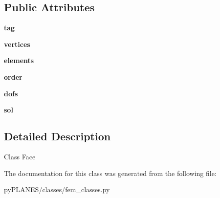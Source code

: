 \subsection*{Public Attributes}
\begin{DoxyCompactItemize}
\item 
\mbox{\label{classpy_p_l_a_n_e_s_1_1classes_1_1fem__classes_1_1_face_a414d49b99bd4c544739e1ec81b8dd9a9}} 
{\bfseries tag}
\item 
\mbox{\label{classpy_p_l_a_n_e_s_1_1classes_1_1fem__classes_1_1_face_a41ea53ceb43a43f52dcf54804114b7df}} 
{\bfseries vertices}
\item 
\mbox{\label{classpy_p_l_a_n_e_s_1_1classes_1_1fem__classes_1_1_face_a808f1904143f264c7344cc03d6bb3327}} 
{\bfseries elements}
\item 
\mbox{\label{classpy_p_l_a_n_e_s_1_1classes_1_1fem__classes_1_1_face_a6dd7fbf08694fc06a32146293d7ccf8c}} 
{\bfseries order}
\item 
\mbox{\label{classpy_p_l_a_n_e_s_1_1classes_1_1fem__classes_1_1_face_ababe401581453db1ecf5bb1de6b9fb2d}} 
{\bfseries dofs}
\item 
\mbox{\label{classpy_p_l_a_n_e_s_1_1classes_1_1fem__classes_1_1_face_a17c9de278c931b618526cb84ab044549}} 
{\bfseries sol}
\end{DoxyCompactItemize}


\subsection{Detailed Description}
\begin{DoxyVerb}Class Face \end{DoxyVerb}
 

The documentation for this class was generated from the following file\+:\begin{DoxyCompactItemize}
\item 
py\+P\+L\+A\+N\+E\+S/classes/fem\+\_\+classes.\+py\end{DoxyCompactItemize}
